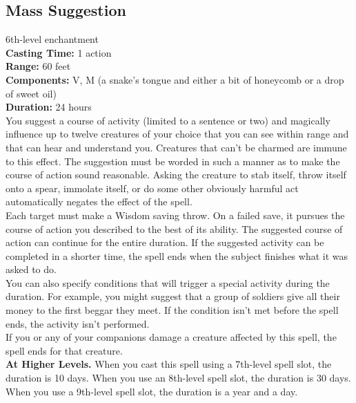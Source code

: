 \documentclass[11pt, A4paper, english]{article}
\begin{document}
		\subsection{Mass Suggestion}
6th-level enchantment \\
\textbf{Casting Time:} 1 action \\
\textbf{Range:} 60 feet \\
\textbf{Components:} V, M (a snake’s tongue and either a bit of honeycomb or a drop of sweet oil) \\
\textbf{Duration:} 24 hours \\
You suggest a course of activity (limited to a sentence or two) and magically influence up to twelve creatures of your choice that you can see within range and that can hear and understand you. Creatures that can’t be charmed are immune to this effect. The suggestion must be worded in such a manner as to make the course of action sound reasonable. Asking the creature to stab itself, throw itself onto a spear, immolate itself, or do some other obviously harmful act automatically negates the effect of the spell. \\
Each target must make a Wisdom  saving throw. On a failed save, it pursues the course of action you described to the best of its ability. The suggested course of action can continue for the entire duration. If the suggested activity can be completed in a shorter time, the spell ends when the subject finishes what it was asked to do. \\
You can also specify conditions that will trigger a special activity during the duration. For example, you might suggest that a group of soldiers give all their money to the first beggar they meet. If the condition isn’t met before the spell ends, the activity isn’t performed. \\
If you or any of your companions damage a creature affected by this spell, the spell ends for that creature. \\
\textbf{At Higher Levels.} When you cast this spell using a 7th-level spell slot, the duration is 10 days. When you use an 8th-level spell slot, the duration is 30 days. When you use a 9th-level spell slot, the duration is a year and a day.
\end{document}
